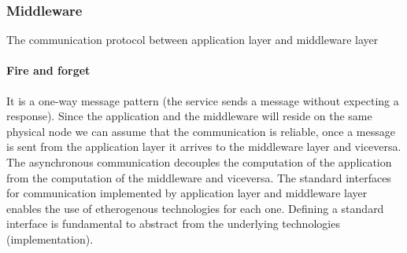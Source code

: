 \subsubsection{Middleware}
The communication protocol between application layer and middleware layer 
\paragraph{Fire and forget} 
It is a one-way message pattern (the service sends a message without expecting a response). 
Since the application and the middleware will reside on the same physical node we can assume 
that the communication is reliable, once a message is sent from the application layer it arrives to 
the middleware layer and viceversa.
The asynchronous communication decouples the computation of the application from the 
computation of the middleware and viceversa. The standard interfaces for communication 
implemented by application layer and middleware layer enables the use of etherogenous 
technologies for each one. Defining a standard interface is fundamental to abstract from 
the underlying technologies (implementation).

